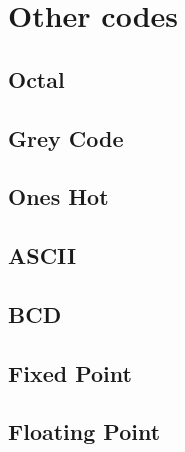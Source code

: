 \section{Other codes}

\subsection{Octal}

\subsection{Grey Code}

\subsection{Ones Hot}

\subsection{ASCII}

\subsection{BCD}

\subsection{Fixed Point}

\subsection{Floating Point}

